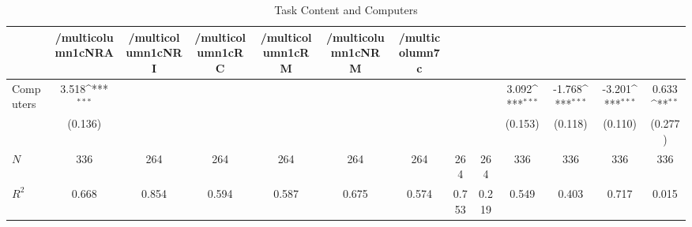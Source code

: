 \begin{table}[htbp]\centering
\def\sym#1{\ifmmode^{#1}\else\(^{#1}\)\fi}
\caption{Task Content and Computers}
\begin{tabular}{l*{12}{c}}
\hline\hline
            &/multicolumn{1}{c}{NRA}&/multicolumn{1}{c}{NRI}&/multicolumn{1}{c}{RC}&/multicolumn{1}{c}{RM}&/multicolumn{1}{c}{NRM}&/multicolumn{7}{c}{}                                                                                                                                     \\
\hline
Computers   &       3.518\sym{***}&                     &                     &                     &                     &                     &                     &                     &       3.092\sym{***}&      -1.768\sym{***}&      -3.201\sym{***}&       0.633\sym{**} \\
            &     (0.136)         &                     &                     &                     &                     &                     &                     &                     &     (0.153)         &     (0.118)         &     (0.110)         &     (0.277)         \\
\hline
\(N\)       &         336         &         264         &         264         &         264         &         264         &         264         &         264         &         264         &         336         &         336         &         336         &         336         \\
\(R^{2}\)   &       0.668         &       0.854         &       0.594         &       0.587         &       0.675         &       0.574         &       0.753         &       0.219         &       0.549         &       0.403         &       0.717         &       0.015         \\
\hline\hline
\end{tabular}
\end{table}
